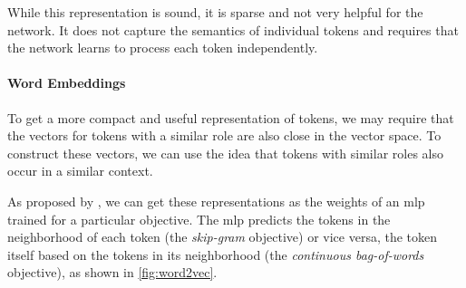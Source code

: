 While this representation is sound, it is sparse and not very helpful for the network. It does not capture the semantics of individual tokens and requires that the network learns to process each token independently.

\paragraph{Word Embeddings} To get a more compact and useful representation of tokens, we may require that the vectors for tokens with a similar role are also close in the vector space. To construct these vectors, we can use the idea that tokens with similar roles also occur in a similar context.

As proposed by \citet{mikolov2013distributed}, we can get these representations as the weights of an \ac{mlp} trained for a particular objective. The \ac{mlp} predicts the tokens in the neighborhood of each token (the \emph{skip-gram} objective) or vice versa, the token itself based on the tokens in its neighborhood (the \textit{continuous bag-of-words} objective), as shown in \autoref{fig:word2vec}.

